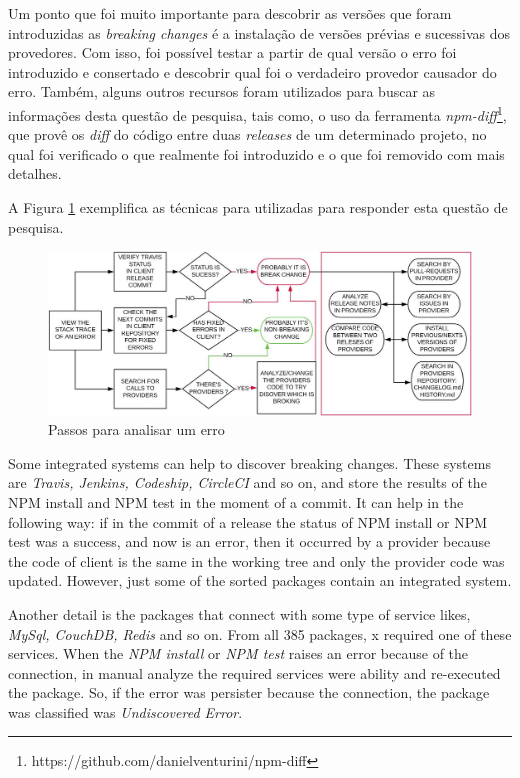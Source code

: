Um ponto que foi muito importante para descobrir as versões que foram introduzidas as \textit{breaking changes} é a instalação de versões prévias e sucessivas dos provedores. Com isso, foi possível testar a partir de qual versão o erro foi introduzido e consertado e descobrir qual foi o verdadeiro provedor causador do erro. Também, alguns outros recursos foram utilizados para buscar as informações desta questão de pesquisa, tais como, o uso da ferramenta \textit{npm-diff}\footnote{https://github.com/danielventurini/npm-diff}, que provê os \textit{diff} do código entre duas \textit{releases} de um determinado projeto, no qual foi verificado o que realmente foi introduzido e o que foi removido com mais detalhes.

A Figura \ref{fig:step_analyze} exemplifica as técnicas para utilizadas para responder esta questão de pesquisa.

\begin{figure}
    \centering
    \includegraphics[scale=0.35]{figuras/step_analyze.jpeg}
    \caption{Passos para analisar um erro}
    \label{fig:step_analyze}
\end{figure}

Some integrated systems can help to discover breaking changes. These systems are \textit{Travis, Jenkins, Codeship, CircleCI} and so on, and store the results of the \Gls{NPM} install and \Gls{NPM} test in the moment of a commit. It can help in the following way: if in the commit of a release the status of \Gls{NPM} install or \Gls{NPM} test was a success, and now is an error, then it occurred by a provider because the code of client is the same in the working tree and only the provider code was updated. However, just some of the sorted packages contain an integrated system.

Another detail is the packages that connect with some type of service likes, \textit{MySql, CouchDB, Redis} and so on. From all 385 packages, x required one of these services. When the \textit{\Gls{NPM} install} or \textit{\Gls{NPM} test} raises an error because of the connection, in manual analyze the required services were ability and re-executed the package. So, if the error was persister because the connection, the package was classified was \textit{Undiscovered Error}.

